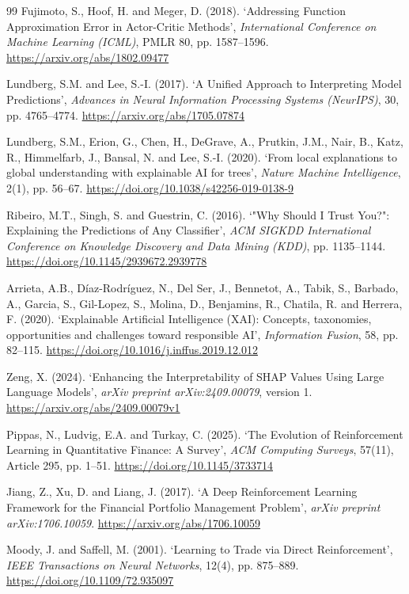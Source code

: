 \documentclass[11pt,a4paper]{article}
\begin{document}
\begin{thebibliography}{99}
 Fujimoto, S., Hoof, H. and Meger, D. (2018). `Addressing Function Approximation Error in Actor-Critic Methods', \textit{International Conference on Machine Learning (ICML)}, PMLR 80, pp. 1587--1596. \url{https://arxiv.org/abs/1802.09477}

 Lundberg, S.M. and Lee, S.-I. (2017). `A Unified Approach to Interpreting Model Predictions', \textit{Advances in Neural Information Processing Systems (NeurIPS)}, 30, pp. 4765--4774. \url{https://arxiv.org/abs/1705.07874}

 Lundberg, S.M., Erion, G., Chen, H., DeGrave, A., Prutkin, J.M., Nair, B., Katz, R., Himmelfarb, J., Bansal, N. and Lee, S.-I. (2020). `From local explanations to global understanding with explainable AI for trees', \textit{Nature Machine Intelligence}, 2(1), pp. 56--67. \url{https://doi.org/10.1038/s42256-019-0138-9}

 Ribeiro, M.T., Singh, S. and Guestrin, C. (2016). `"Why Should I Trust You?": Explaining the Predictions of Any Classifier', \textit{ACM SIGKDD International Conference on Knowledge Discovery and Data Mining (KDD)}, pp. 1135--1144. \url{https://doi.org/10.1145/2939672.2939778}

 Arrieta, A.B., D\'iaz-Rodr\'iguez, N., Del Ser, J., Bennetot, A., Tabik, S., Barbado, A., Garcia, S., Gil-Lopez, S., Molina, D., Benjamins, R., Chatila, R. and Herrera, F. (2020). `Explainable Artificial Intelligence (XAI): Concepts, taxonomies, opportunities and challenges toward responsible AI', \textit{Information Fusion}, 58, pp. 82--115. \url{https://doi.org/10.1016/j.inffus.2019.12.012}

 Zeng, X. (2024). `Enhancing the Interpretability of SHAP Values Using Large Language Models', \textit{arXiv preprint arXiv:2409.00079}, version 1. \url{https://arxiv.org/abs/2409.00079v1}

 Pippas, N., Ludvig, E.A. and Turkay, C. (2025). `The Evolution of Reinforcement Learning in Quantitative Finance: A Survey', \textit{ACM Computing Surveys}, 57(11), Article 295, pp. 1--51. \url{https://doi.org/10.1145/3733714}

 Jiang, Z., Xu, D. and Liang, J. (2017). `A Deep Reinforcement Learning Framework for the Financial Portfolio Management Problem', \textit{arXiv preprint arXiv:1706.10059}. \url{https://arxiv.org/abs/1706.10059}

 Moody, J. and Saffell, M. (2001). `Learning to Trade via Direct Reinforcement', \textit{IEEE Transactions on Neural Networks}, 12(4), pp. 875--889. \url{https://doi.org/10.1109/72.935097}


\end{thebibliography}
\end{document}
